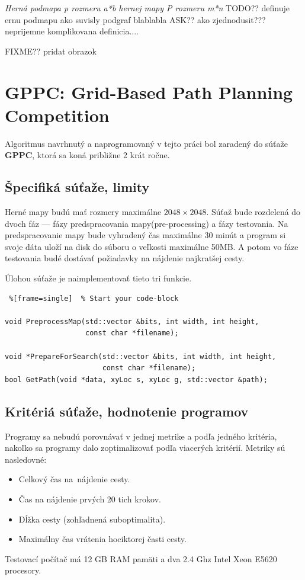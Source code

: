 \begin{define}
{\sl Herná podmapa p rozmeru a*b hernej mapy P rozmeru m*n} 
TODO?? definuje ernu podmapu ako suvisly podgraf blablabla ASK?? ako zjednodusit??? neprijemne komplikovana definicia....

\end{define}
FIXME?? pridat obrazok


\section{GPPC: Grid-Based Path Planning Competition}
Algoritmus navrhnutý a naprogramovaný v tejto práci bol zaradený do súťaže \textbf{GPPC}, ktorá sa koná približne 2 krát ročne.

\subsection{Špecifiká súťaže, limity}

Herné mapy budú mať rozmery maximálne $2048 \times 2048$.
Súťaž bude rozdelená do dvoch fáz --- fázy predspracovania mapy(pre-processing)
a fázy testovania. Na predspracovanie mapy bude vyhradený čas
maximálne 30 minút a program si svoje dáta uloží na disk do súboru o veľkosti maximálne 50MB.
A potom vo fáze testovania budé dostávať požiadavky na nájdenie najkratšej cesty.

Úlohou súťaže je naimplementovať tieto tri funkcie.

\lstset{language=C++}          %

\begin{lstlisting} %[frame=single]  % Start your code-block

void PreprocessMap(std::vector &bits, int width, int height,
                   const char *filename);
                   
void *PrepareForSearch(std::vector &bits, int width, int height,
                       const char *filename);
bool GetPath(void *data, xyLoc s, xyLoc g, std::vector &path);
\end{lstlisting}

\subsection{Kritériá súťaže, hodnotenie programov}
Programy sa nebudú porovnávať v jednej metrike a podľa jedného
kritéria, nakoľko sa programy dalo zoptimalizovať podľa viacerých kritérií. Metriky sú nasledovné:

\begin{itemize}
\item Celkový čas na~nájdenie cesty.
\item Čas na nájdenie prvých 20 tich krokov.
\item Dĺžka cesty (zohľadnená suboptimalita).
\item Maximálny čas vrátenia hociktorej časti cesty.
\end{itemize}

Testovací počítač má 12 GB RAM pamäti a dva 2.4 Ghz Intel Xeon E5620
procesory.